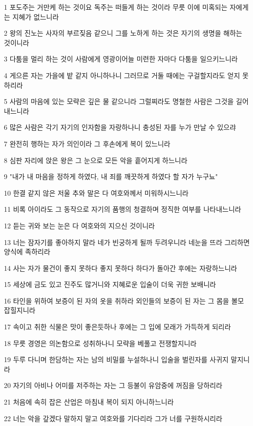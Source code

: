 \par 1 포도주는 거만케 하는 것이요 독주는 떠들게 하는 것이라 무릇 이에 미혹되는 자에게는 지혜가 없느니라
\par 2 왕의 진노는 사자의 부르짖음 같으니 그를 노하게 하는 것은 자기의 생명을 해하는 것이니라
\par 3 다툼을 멀리 하는 것이 사람에게 영광이어늘 미련한 자마다 다툼을 일으키느니라
\par 4 게으른 자는 가을에 밭 같지 아니하나니 그러므로 거둘 때에는 구걸할지라도 얻지 못하리라
\par 5 사람의 마음에 있는 모략은 깊은 물 같으니라 그럴찌라도 명철한 사람은 그것을 길어 내느니라
\par 6 많은 사람은 각기 자기의 인자함을 자랑하나니 충성된 자를 누가 만날 수 있으랴
\par 7 완전히 행하는 자가 의인이라 그 후손에게 복이 있느니라
\par 8 심판 자리에 앉은 왕은 그 눈으로 모든 악을 흩어지게 하느니라
\par 9 "내가 내 마음을 정하게 하였다, 내 죄를 깨끗하게 하였다 할 자가 누구뇨"
\par 10 한결 같지 않은 저울 추와 말은 다 여호와께서 미워하시느니라
\par 11 비록 아이라도 그 동작으로 자기의 품행의 청결하며 정직한 여부를 나타내느니라
\par 12 듣는 귀와 보는 눈은 다 여호와의 지으신 것이니라
\par 13 너는 잠자기를 좋아하지 말라 네가 빈궁하게 될까 두려우니라 네눈을 뜨라 그리하면 양식에 족하리라
\par 14 사는 자가 물건이 좋지 못하다 좋지 못하다 하다가 돌아간 후에는 자랑하느니라
\par 15 세상에 금도 있고 진주도 많거니와 지혜로운 입술이 더욱 귀한 보배니라
\par 16 타인을 위하여 보증이 된 자의 옷을 취하라 외인들의 보증이 된 자는 그 몸을 볼모 잡힐지니라
\par 17 속이고 취한 식물은 맛이 좋은듯하나 후에는 그 입에 모래가 가득하게 되리라
\par 18 무릇 경영은 의논함으로 성취하나니 모략을 베풀고 전쟁할지니라
\par 19 두루 다니며 한담하는 자는 남의 비밀를 누설하나니 입술을 벌린자를 사귀지 말지니라
\par 20 자기의 아비나 어미를 저주하는 자는 그 등불이 유암중에 꺼짐을 당하리라
\par 21 처음에 속히 잡은 산업은 마침내 복이 되지 아니하느니라
\par 22 너는 악을 갚겠다 말하지 말고 여호와를 기다리라 그가 너를 구원하시리라
